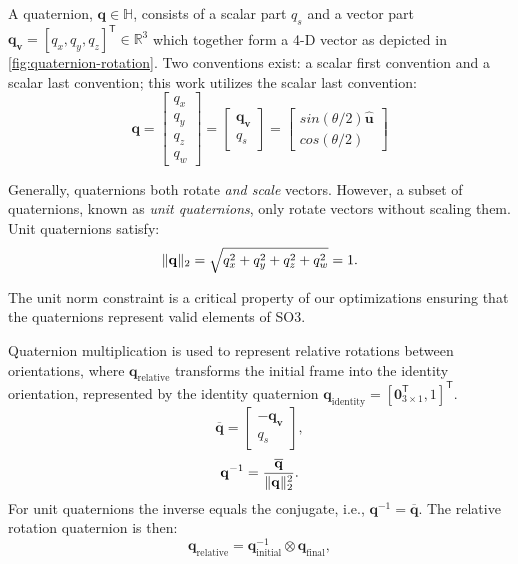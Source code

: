 A quaternion, \(\mathbf{q} \in \mathbb{H}\), consists of a scalar part \(q_s\) and a vector part \(\mathbf{q_v} = [q_x, q_y, q_z]^\mathsf{T} \in \mathbb{R}^3\) which together form a \ac{4-D} vector \cite{Diebel06,Schuster93} as depicted in \cref{fig:quaternion-rotation}.
Two conventions exist: a scalar first convention and a scalar last convention; this work utilizes the scalar last convention:
\begin{equation}
    \mathbf{q} = 
    \begin{bmatrix}
        q_x \\
        q_y \\
        q_z \\
        q_w
    \end{bmatrix}
    =
    \begin{bmatrix}
        \mathbf{q_v} \\
        q_s
    \end{bmatrix}
    = 
    \begin{bmatrix}
        sin(\theta/2) \hat{\mathbf{u}} \\
        cos(\theta/2)
    \end{bmatrix}
\label{eq:quaternion-scalar-last}
\end{equation}



Generally, quaternions both rotate \emph{and scale} vectors. 
However, a subset of quaternions, known as \emph{unit quaternions}, only rotate vectors without scaling them. 
Unit quaternions satisfy:
\begin{equation}
    \lVert \mathbf{q} \rVert_{2} = \sqrt{ q_x^2 + q_y^2 + q_z^2 + q_w^2} = 1.
\label{eq:unit-quaternion}
\end{equation}

The unit norm constraint is a critical property of our optimizations ensuring that the quaternions represent valid elements of \ac{SO3}.

Quaternion multiplication is used to represent relative rotations between orientations, where \(\mathbf{q}_{\text{relative}}\) transforms the initial frame into the identity orientation, represented by the identity quaternion $\mathbf{q}_{\text{identity}} = [\mathbf{0}_{3 \times 1}^\mathsf{T}, 1]^\mathsf{T}$.
\begin{equation}
    \overline{\mathbf{q}} = 
    \begin{bmatrix}
        -\mathbf{q_v} \\
        q_s
    \end{bmatrix},
\label{eq:quaternion-conjugate}
\end{equation}
\begin{equation}
    \mathbf{q}^{-1} = 
    \frac{\overline{\mathbf{q}}}{\lVert \mathbf{q} \rVert_{2}^2}.
\label{eq:quaternion-inverse}
\end{equation}
For unit quaternions the inverse equals the conjugate, i.e., $\mathbf{q}^{-1} = \overline{\mathbf{q}}$. The relative rotation quaternion is then:
\begin{equation}
    \mathbf{q}_{\text{relative}} = \mathbf{q}_{\text{initial}}^{-1} \otimes \mathbf{q}_{\text{final}},
\label{eq:relative-quaternion}
\end{equation}

